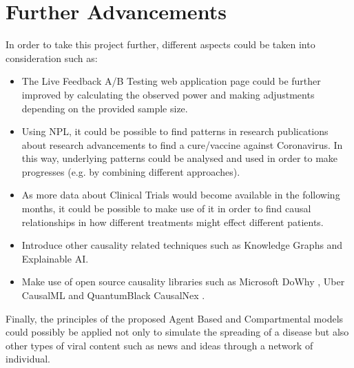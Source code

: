 \section{Further Advancements}

In order to take this project further, different aspects could be taken into consideration such as:
\vspace{-0.2cm}
\begin{itemize}
    \item The Live Feedback A/B Testing web application page could be further improved by calculating the observed power and making adjustments depending on the provided sample size.
    \item Using NPL, it could be possible to find patterns in research publications about research advancements to find a cure/vaccine against Coronavirus. In this way, underlying patterns could be analysed and used in order to make progresses (e.g. by combining different approaches).
    \item As more data about Clinical Trials would become available in the following months, it could be possible to make use of it in order to find causal relationships in how different treatments might effect different patients. 
    \item Introduce other causality related techniques such as Knowledge Graphs and Explainable AI. 
    \item Make use of open source causality libraries such as Microsoft DoWhy \cite{dowhy}, Uber CausalML \cite{causalml} and QuantumBlack CausalNex \cite{causalnex}. 
\end{itemize}
\vspace{-0.2cm}

Finally, the principles of the proposed Agent Based and Compartmental models could possibly be applied not only to simulate the spreading of a disease but also other types of viral content such as news and ideas through a network of individual.



